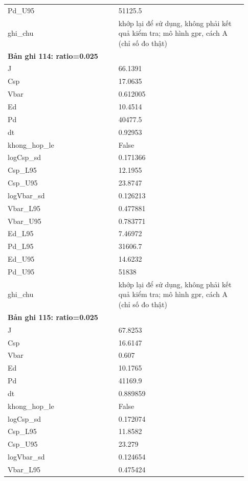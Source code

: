 \begin{longtable}{p{0.43\linewidth}p{0.50\linewidth}}
Pd\_\allowbreak U95 & 51125.5 \\
ghi\_\allowbreak chu & khớp lại để sử dụng, không phải kết quả kiểm tra; mô hình gpr, cách A (chỉ số đo thật) \\
\midrule
\multicolumn{2}{p{0.95\linewidth}}{\textbf{Bản ghi 114: ratio=0.025}} \\
J & 66.1391 \\
Csp & 17.0635 \\
Vbar & 0.612005 \\
Ed & 10.4514 \\
Pd & 40477.5 \\
dt & 0.92953 \\
khong\_\allowbreak hop\_\allowbreak le & False \\
logCsp\_\allowbreak sd & 0.171366 \\
Csp\_\allowbreak L95 & 12.1955 \\
Csp\_\allowbreak U95 & 23.8747 \\
logVbar\_\allowbreak sd & 0.126213 \\
Vbar\_\allowbreak L95 & 0.477881 \\
Vbar\_\allowbreak U95 & 0.783771 \\
Ed\_\allowbreak L95 & 7.46972 \\
Pd\_\allowbreak L95 & 31606.7 \\
Ed\_\allowbreak U95 & 14.6232 \\
Pd\_\allowbreak U95 & 51838 \\
ghi\_\allowbreak chu & khớp lại để sử dụng, không phải kết quả kiểm tra; mô hình gpr, cách A (chỉ số đo thật) \\
\midrule
\multicolumn{2}{p{0.95\linewidth}}{\textbf{Bản ghi 115: ratio=0.025}} \\
J & 67.8253 \\
Csp & 16.6147 \\
Vbar & 0.607 \\
Ed & 10.1765 \\
Pd & 41169.9 \\
dt & 0.889859 \\
khong\_\allowbreak hop\_\allowbreak le & False \\
logCsp\_\allowbreak sd & 0.172074 \\
Csp\_\allowbreak L95 & 11.8582 \\
Csp\_\allowbreak U95 & 23.279 \\
logVbar\_\allowbreak sd & 0.124654 \\
Vbar\_\allowbreak L95 & 0.475424 \\

\end{longtable}
